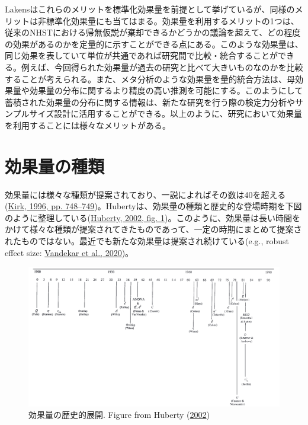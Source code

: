 \documentclass[
  ja=standard, xelatex, base=12pt]{bxjsreport}
\begin{document}
Lakensはこれらのメリットを標準化効果量を前提として挙げているが、同様のメリットは非標準化効果量にも当てはまる。効果量を利用するメリットの1つは、従来のNHSTにおける帰無仮説が棄却できるかどうかの議論を超えて、どの程度の効果があるのかを定量的に示すことができる点にある。このような効果量は、同じ効果を表していて単位が共通であれば研究間で比較・統合することができる。例えば、今回得られた効果量が過去の研究と比べて大きいものなのかを比較することが考えられる。また、メタ分析のような効果量を量的統合方法は、母効果量や効果量の分布に関するより精度の高い推測を可能にする。このようにして蓄積された効果量の分布に関する情報は、新たな研究を行う際の検定力分析やサンプルサイズ設計に活用することができる。以上のように、研究において効果量を利用することには様々なメリットがある。

\hypertarget{ux52b9ux679cux91cfux306eux7a2eux985e}{%
\section{効果量の種類}\label{ux52b9ux679cux91cfux306eux7a2eux985e}}

効果量には様々な種類が提案されており、一説によればその数は40を超える(\protect\hyperlink{ref-kirk1996}{Kirk, 1996, pp. 748--749})。Hubertyは、効果量の種類と歴史的な登場時期を下図のように整理している(\protect\hyperlink{ref-huberty2002}{Huberty, 2002, fig. 1})。このように、効果量は長い時間をかけて様々な種類が提案されてきたものであって、一定の時期にまとめて提案されたものではない。最近でも新たな効果量は提案され続けている(e.g., robust effect size: \protect\hyperlink{ref-vandekar2020}{Vandekar et al., 2020})。

\begin{figure}
\centering
\includegraphics{images/paste-11880CB3.png}
\caption{効果量の歴史的展開. Figure from Huberty (\protect\hyperlink{ref-huberty2002}{2002})}
\end{figure}
\end{document}
